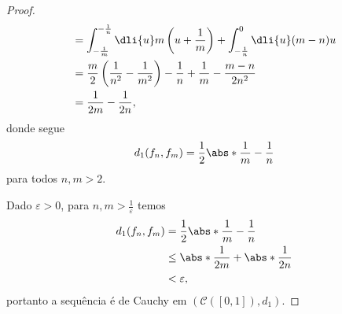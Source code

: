 \begin{proof}
\begin{align*}
                      &= \int_{-\frac1m}^{-\frac1n}\dli{u} m\left(u + \frac1m\right) + \int_{-\frac1n}^{0} \dli{u} (m-n)u\\
                      &= \frac{m}{2}\left(\frac{1}{n^2} - \frac{1}{m^2}\right) - \frac1n + \frac1m - \frac{m-n}{2n^2}\\
                      &= \frac{1}{2m}-\frac{1}{2n},
    \end{align*}
    donde segue
    \begin{equation*}
        d_1(f_n, f_m) = \frac12\abs*{\frac1m - \frac1n}
    \end{equation*}
    para todos \(n,m > 2\).

    Dado \(\varepsilon > 0\), para \(n,m > \frac{1}{\varepsilon}\) temos
    \begin{align*}
        d_1(f_n, f_m) &= \frac12\abs*{\frac1m - \frac1n}\\
                      &\leq \abs*{\frac1{2m}} + \abs*{\frac{1}{2n}}\\
                      &< \varepsilon,
    \end{align*}
    portanto a sequência é de Cauchy em \((\mathcal{C}([0,1]), d_1)\).
\end{proof}

